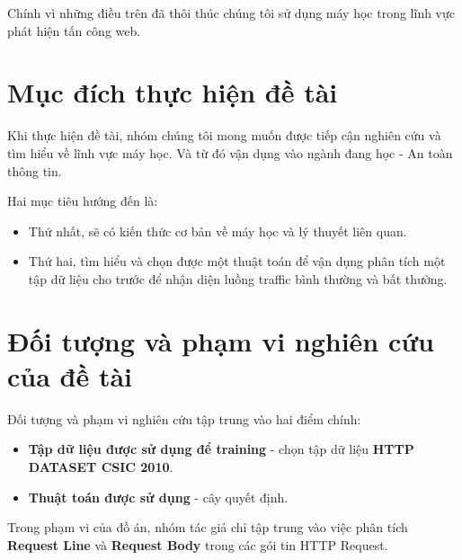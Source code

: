 Chính vì những điều trên đã thôi thúc chúng tôi sử dụng máy học trong lĩnh vực phát hiện tấn công web.

\section*{Mục đích thực hiện đề tài}
Khi thực hiện đề tài, nhóm chúng tôi mong muốn được tiếp cận nghiên cứu và tìm hiểu về lĩnh vực máy học. Và từ đó vận dụng vào ngành đang học - An toàn thông tin.

Hai mục tiêu hướng đến là:

\begin{itemize}
  \item Thứ nhất, sẽ có kiến thức cơ bản về máy học và lý thuyết liên quan.
  \item Thứ hai, tìm hiểu và chọn được một thuật toán để vận dụng phân tích một tập dữ liệu cho trước để nhận diện luồng traffic bình thường và bất thường.
\end{itemize}

\section*{Đối tượng và phạm vi nghiên cứu của đề tài}
Đối tượng và phạm vi nghiên cứu tập trung vào hai điểm chính:

\begin{itemize}
  \item \textbf{Tập dữ liệu được sử dụng để training} - chọn tập dữ liệu \textbf{HTTP DATASET CSIC 2010}.
  \item \textbf{Thuật toán được sử dụng} - cây quyết định.
\end{itemize}

Trong phạm vi của đồ án, nhóm tác giả chỉ tập trung vào việc phân tích \textbf{Request Line} và \textbf{Request Body} trong các gói tin HTTP Request.

